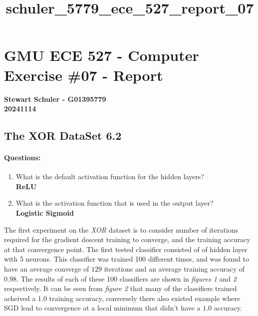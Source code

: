 \documentclass[11pt]{article}
\title{schuler\_5779\_ece\_527\_report\_07}
\providecommand{\tightlist}{%
      \setlength{\itemsep}{0pt}\setlength{\parskip}{0pt}}
\begin{document}
    
    \maketitle
    
    

    
    \hypertarget{gmu-ece-527---computer-exercise-07---report}{%
\section{GMU ECE 527 - Computer Exercise \#07 -
Report}\label{gmu-ece-527---computer-exercise-07---report}}

\textbf{Stewart Schuler - G01395779}\\
\textbf{20241114}

    \hypertarget{the-xor-dataset-6.2}{%
\subsection{The XOR DataSet 6.2}\label{the-xor-dataset-6.2}}

\hypertarget{questions}{%
\paragraph{Questions:}\label{questions}}

\begin{enumerate}
\def\labelenumi{\arabic{enumi})}
\tightlist
\item
  What is the default activation function for the hidden layers?\\
  \textbf{ReLU}
\item
  What is the activation function that is used in the output layer?\\
  \textbf{Logistic Sigmoid}
\end{enumerate}

The first experiment on the \emph{XOR} dataset is to consider number of
iterations required for the gradient descent training to converge, and
the training accuracy at that convergence point. The first tested
classifier consisted of of hidden layer with 5 neurons. This classifier
was trained 100 different times, and was found to have an average
converge of \(129\) iterations and an average training accuracy of
\(0.98\). The results of each of these 100 classifiers are shown in
\emph{figures 1} and \emph{2} respectively. It can be seen from
\emph{figure 2} that many of the classifiers trained acheived a \(1.0\)
training accuracy, conversely there also existed example where SGD lead
to convergence at a local minimum that didn't have a \(1.0\) accuracy.
\end{document}
